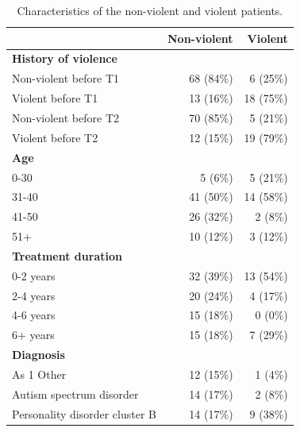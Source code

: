 \documentclass[a4paper,11pt]{article}
\begin{document}
\begin{table}[!ht]
    \caption{Characteristics of the non-violent and violent patients.}
    \label{tb:backgroundinfo}
    \centering
    \begin{tabular}{lrr}
        \toprule
                                                                    &  Non-violent & Violent \\
        \midrule
\textbf{History of violence}		  &&\\
\hspace{3mm} Non-violent before T1 	 & 68 (84\%) & 6 (25\%) \\
\hspace{3mm} Violent before T1 	 & 13 (16\%) & 18 (75\%) \\
\hspace{3mm} Non-violent before T2 	 & 70 (85\%) & 5 (21\%) \\
\hspace{3mm} Violent before T2 	 & 12 (15\%) & 19 (79\%) \\
\textbf{Age}		  &&\\
\hspace{3mm} 0-30 	 & 5 (6\%) & 5 (21\%) \\
\hspace{3mm} 31-40 	 & 41 (50\%) & 14 (58\%) \\
\hspace{3mm} 41-50 	 & 26 (32\%) & 2 (8\%) \\
\hspace{3mm} 51+ 	 & 10 (12\%) & 3 (12\%) \\
\textbf{Treatment duration}		  &&\\
\hspace{3mm} 0-2 years 	 & 32 (39\%) & 13 (54\%) \\
\hspace{3mm} 2-4 years 	 & 20 (24\%) & 4 (17\%) \\
\hspace{3mm} 4-6 years 	 & 15 (18\%) & 0 (0\%) \\
\hspace{3mm} 6+ years 	 & 15 (18\%) & 7 (29\%) \\
\textbf{Diagnosis}		  &&\\
\hspace{3mm} As 1 Other 	 & 12 (15\%) & 1 (4\%) \\
\hspace{3mm} Autism spectrum disorder 	 & 14 (17\%) & 2 (8\%) \\
\hspace{3mm} Personality disorder cluster B 	 & 14 (17\%) & 9 (38\%) \\

\end{tabular}
\end{table}
\end{document}
